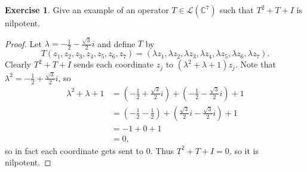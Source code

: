 \documentclass{article}
\theoremstyle{definition}
\newtheorem{ex}{Exercise}
\begin{document}
\begin{ex}
	Give an example of an operator $T \in \mathcal{L}(\mathbb{C}^7)$ such that $T^2 + T + I$ is nilpotent.
\end{ex}
\begin{proof}
	Let $\lambda = -\frac{1}{2}-\frac{\sqrt{3}}{2}i$ and define $T$ by \begin{equation*}
		T(z_1, z_2, z_3, z_4, z_5, z_6, z_7) = (\lambda z_1, \lambda z_2, \lambda z_3, \lambda z_4, \lambda z_5, \lambda z_6, \lambda z_7).
	\end{equation*}
	Clearly $T^2 + T + I$ sends each coordinate $z_j$ to $(\lambda^2 + \lambda + 1)z_j$.
	Note that $\lambda^2 = -\frac{1}{2} + \frac{\sqrt{3}}{2}i$, so \begin{align*}
		\lambda^2 + \lambda + 1 & = \left(-\frac{1}{2} + \frac{\sqrt{3}}{2}i\right) + \left(-\frac{1}{2}-\frac{\sqrt{3}}{2}i\right) + 1  \\
		                        & = \left(-\frac{1}{2} - \frac{1}{2}\right) + \left(\frac{\sqrt{3}}{2}i - \frac{\sqrt{3}}{2}i\right) + 1 \\
		                        & = -1 + 0 + 1                                                                                           \\
		                        & = 0,
	\end{align*}
	so in fact each coordinate gets sent to 0.
  Thus $T^2 + T + I = 0$, so it is nilpotent.
\end{proof}
\end{document}
